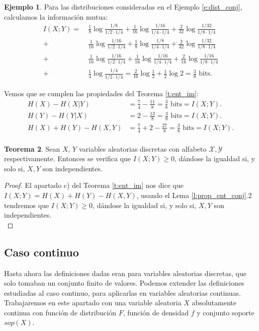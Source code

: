 \documentclass[12pt,a4paper]{report} %
\theoremstyle{definition}
\newtheorem{theorem}{Teorema}[section]
\newtheorem{example}[theorem]{Ejemplo}
\begin{document}
\begin{example}
  Para las distribuciones consideradas en el Ejemplo \ref{e:dist_conj}, calculamos la información mutua:
  \begin{align*}
    I(X;Y) =\ & \frac{1}{8} \log \frac{1/8}{1/2 \cdot 1/4} + \frac{1}{16} \log \frac{1/16}{1/4 \cdot 1/4} + \frac{2}{32} \log \frac{1/32}{1/8 \cdot 1/4}\\[3pt] +& \frac{1}{16} \log \frac{1/16}{1/2 \cdot 1/4} + \frac{1}{8} \log \frac{1/8}{1/4 \cdot 1/4} + \frac{2}{32} \log \frac{1/32}{1/8 \cdot 1/4}\\[3pt] +& \frac{1}{16} \log \frac{1/16}{1/2 \cdot 1/4} + \frac{1}{16} \log \frac{1/16}{1/4 \cdot 1/4} + \frac{2}{16} \log \frac{1/16}{1/8 \cdot 1/4}\\[3pt] +& \frac{1}{4} \log \frac{1/4}{1/2 \cdot 1/4} = \frac{2}{16} \log \frac{1}{2} + \frac{1}{2} \log 2 = \frac{3}{8} \text{ bits}.
  \end{align*}

  Vemos que se cumplen las propiedades del Teorema \ref{t:ent_im}:
  \begin{align*}
    H(X) -H(X|Y) &= \frac{7}{4} - \frac{11}{8} = \frac{3}{8} \text{ bits} = I(X;Y).\\
    H(Y) -H(Y|X) &= 2 - \frac{13}{8} = \frac{3}{8} \text{ bits} = I(X;Y).\\
    H(X) + H(Y) - H(X,Y) &= \frac{7}{4} + 2 - \frac{27}{8} = \frac{3}{8} \text{ bits} = I(X;Y).\\
  \end{align*}
\end{example}

\begin{theorem}\label{t:im_indd}
  Sean $X$, $Y$ variables aleatorias discretas con alfabeto $\mathcal{X}, \mathcal{Y}$ respectivamente. Entonces se verifica que $I(X;Y)\ge 0$, dándose la igualdad si, y solo si, $X,Y$ son independientes.
\end{theorem}
\begin{proof}
El apartado c) del Teorema \ref{t:ent_im} nos dice que $I(X;Y) = H(X)+H(Y)-H(X,Y)$, usando el Lema \ref{l:prop_ent_conj}.2 tendremos que $I(X;Y)\ge 0$, dándose la igualdad si, y solo si, $X,Y$ son independientes.\\
\end{proof}
\subsection{Caso continuo}
Hasta ahora las definiciones dadas eran para variables aleatorias discretas, que solo tomaban un conjunto finito de valores. Podemos extender las definiciones estudiadas al caso continuo, para aplicarlas en variables aleatorias continuas. Trabajaremos en este apartado con una variable aleatoria $X$ absolutamente continua con función de distribución $F$, función de densidad $f$ y conjunto soporte $sop(X)$.\\
\end{document}
